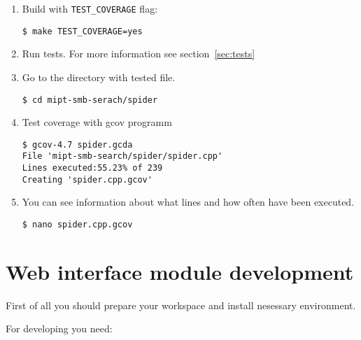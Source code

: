 \begin{enumerate}

\item Build with \texttt{TEST\_COVERAGE} flag:
\begin{lstlisting}
$ make TEST_COVERAGE=yes
\end{lstlisting}

\item Run tests. For more information see section~\ref{sec:tests}

\item Go to the directory with tested file.
\begin{lstlisting}
$ cd mipt-smb-serach/spider
\end{lstlisting}

\item Test coverage with gcov programm
\begin{lstlisting}
$ gcov-4.7 spider.gcda
File 'mipt-smb-search/spider/spider.cpp'
Lines executed:55.23% of 239
Creating 'spider.cpp.gcov'
\end{lstlisting}

\item You can see information about what lines and how often have been executed.
\begin{lstlisting}
$ nano spider.cpp.gcov
\end{lstlisting}

\end{enumerate}

\section{Web interface module development}

First of all you should prepare your workspace and install nesessary environment.

For developing you need:

